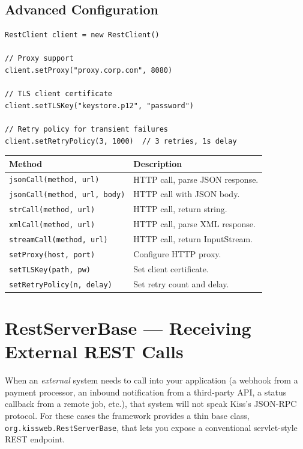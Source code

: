 \subsection{Advanced Configuration}

\begin{lstlisting}[style=groovy]
RestClient client = new RestClient()

// Proxy support
client.setProxy("proxy.corp.com", 8080)

// TLS client certificate
client.setTLSKey("keystore.p12", "password")

// Retry policy for transient failures
client.setRetryPolicy(3, 1000)  // 3 retries, 1s delay
\end{lstlisting}

\begin{longtable}{P{4.8cm}P{5.7cm}}
\toprule
\textbf{Method} & \textbf{Description} \\
\midrule
\endhead
\texttt{jsonCall(method, url)} & HTTP call, parse JSON response. \\
\texttt{jsonCall(method, url, body)} & HTTP call with JSON body. \\
\texttt{strCall(method, url)} & HTTP call, return string. \\
\texttt{xmlCall(method, url)} & HTTP call, parse XML response. \\
\texttt{streamCall(method, url)} & HTTP call, return InputStream. \\
\texttt{setProxy(host, port)} & Configure HTTP proxy. \\
\texttt{setTLSKey(path, pw)} & Set client certificate. \\
\texttt{setRetryPolicy(n, delay)} & Set retry count and delay. \\
\bottomrule
\end{longtable}

\section{RestServerBase --- Receiving External REST Calls}
\label{sec:ext-restserverbase}

When an \emph{external} system needs to call into your application (a webhook from a payment processor, an inbound notification from a third-party API, a status callback from a remote job, etc.), that system will not speak Kiss's JSON-RPC protocol.  For these cases the framework provides a thin base class, \texttt{org.kissweb.RestServerBase}, that lets you expose a conventional servlet-style REST endpoint.

